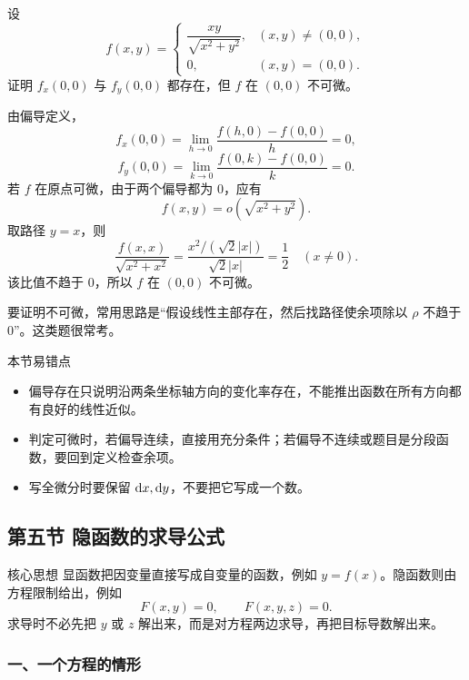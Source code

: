 \begin{problem}
设
\[
f(x,y)=
\begin{cases}
\dfrac{xy}{\sqrt{x^2+y^2}},&(x,y)\ne(0,0),\\[6pt]
0,&(x,y)=(0,0).
\end{cases}
\]
证明 $f_x(0,0)$ 与 $f_y(0,0)$ 都存在，但 $f$ 在 $(0,0)$ 不可微。
\end{problem}
\begin{solution}
由偏导定义，
\[
  f_x(0,0)=\lim_{h\to0}\frac{f(h,0)-f(0,0)}{h}=0,
\]
\[
  f_y(0,0)=\lim_{k\to0}\frac{f(0,k)-f(0,0)}{k}=0.
\]
若 $f$ 在原点可微，由于两个偏导都为 $0$，应有
\[
  f(x,y)=o\left(\sqrt{x^2+y^2}\right).
\]
取路径 $y=x$，则
\[
  \frac{f(x,x)}{\sqrt{x^2+x^2}}
  =\frac{x^2/(\sqrt2|x|)}{\sqrt2|x|}
  =\frac12 \quad (x\ne0).
\]
该比值不趋于 $0$，所以 $f$ 在 $(0,0)$ 不可微。
\end{solution}
\begin{note}
要证明不可微，常用思路是“假设线性主部存在，然后找路径使余项除以 $\rho$ 不趋于 $0$”。这类题很常考。
\end{note}

\begin{warningbox}{本节易错点}
\begin{itemize}
  \item 偏导存在只说明沿两条坐标轴方向的变化率存在，不能推出函数在所有方向都有良好的线性近似。
  \item 判定可微时，若偏导连续，直接用充分条件；若偏导不连续或题目是分段函数，要回到定义检查余项。
  \item 写全微分时要保留 $\mathop{}\!\mathrm{d} x,\mathop{}\!\mathrm{d} y$，不要把它写成一个数。
\end{itemize}
\end{warningbox}

\subsection{第五节 隐函数的求导公式}

\begin{summarybox}{核心思想}
显函数把因变量直接写成自变量的函数，例如 $y=f(x)$。隐函数则由方程限制给出，例如
\[
  F(x,y)=0,\qquad F(x,y,z)=0.
\]
求导时不必先把 $y$ 或 $z$ 解出来，而是对方程两边求导，再把目标导数解出来。
\end{summarybox}

\subsubsection*{一、一个方程的情形}

